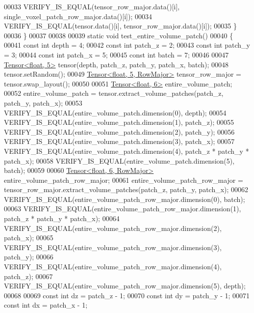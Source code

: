 \begin{DoxyCode}
00033     VERIFY\_IS\_EQUAL(tensor\_row\_major.data()[i], single\_voxel\_patch\_row\_major.data()[i]);
00034     VERIFY\_IS\_EQUAL(tensor.data()[i], tensor\_row\_major.data()[i]);
00035   \}
00036 \}
00037 
00038 
00039 \textcolor{keyword}{static} \textcolor{keywordtype}{void} test\_entire\_volume\_patch()
00040 \{
00041   \textcolor{keyword}{const} \textcolor{keywordtype}{int} depth = 4;
00042   \textcolor{keyword}{const} \textcolor{keywordtype}{int} patch\_z = 2;
00043   \textcolor{keyword}{const} \textcolor{keywordtype}{int} patch\_y = 3;
00044   \textcolor{keyword}{const} \textcolor{keywordtype}{int} patch\_x = 5;
00045   \textcolor{keyword}{const} \textcolor{keywordtype}{int} batch = 7;
00046 
00047   \hyperlink{class_eigen_1_1_tensor}{Tensor<float, 5>} tensor(depth, patch\_z, patch\_y, patch\_x, batch);
00048   tensor.setRandom();
00049   \hyperlink{class_eigen_1_1_tensor}{Tensor<float, 5, RowMajor>} tensor\_row\_major = tensor.swap\_layout();
00050 
00051   \hyperlink{class_eigen_1_1_tensor}{Tensor<float, 6>} entire\_volume\_patch;
00052   entire\_volume\_patch = tensor.extract\_volume\_patches(patch\_z, patch\_y, patch\_x);
00053   VERIFY\_IS\_EQUAL(entire\_volume\_patch.dimension(0), depth);
00054   VERIFY\_IS\_EQUAL(entire\_volume\_patch.dimension(1), patch\_z);
00055   VERIFY\_IS\_EQUAL(entire\_volume\_patch.dimension(2), patch\_y);
00056   VERIFY\_IS\_EQUAL(entire\_volume\_patch.dimension(3), patch\_x);
00057   VERIFY\_IS\_EQUAL(entire\_volume\_patch.dimension(4), patch\_z * patch\_y * patch\_x);
00058   VERIFY\_IS\_EQUAL(entire\_volume\_patch.dimension(5), batch);
00059 
00060   \hyperlink{class_eigen_1_1_tensor}{Tensor<float, 6, RowMajor>} entire\_volume\_patch\_row\_major;
00061   entire\_volume\_patch\_row\_major = tensor\_row\_major.extract\_volume\_patches(patch\_z, patch\_y, patch\_x);
00062   VERIFY\_IS\_EQUAL(entire\_volume\_patch\_row\_major.dimension(0), batch);
00063   VERIFY\_IS\_EQUAL(entire\_volume\_patch\_row\_major.dimension(1), patch\_z * patch\_y * patch\_x);
00064   VERIFY\_IS\_EQUAL(entire\_volume\_patch\_row\_major.dimension(2), patch\_x);
00065   VERIFY\_IS\_EQUAL(entire\_volume\_patch\_row\_major.dimension(3), patch\_y);
00066   VERIFY\_IS\_EQUAL(entire\_volume\_patch\_row\_major.dimension(4), patch\_z);
00067   VERIFY\_IS\_EQUAL(entire\_volume\_patch\_row\_major.dimension(5), depth);
00068 
00069   \textcolor{keyword}{const} \textcolor{keywordtype}{int} dz = patch\_z - 1;
00070   \textcolor{keyword}{const} \textcolor{keywordtype}{int} dy = patch\_y - 1;
00071   \textcolor{keyword}{const} \textcolor{keywordtype}{int} dx = patch\_x - 1;

\end{DoxyCode}
